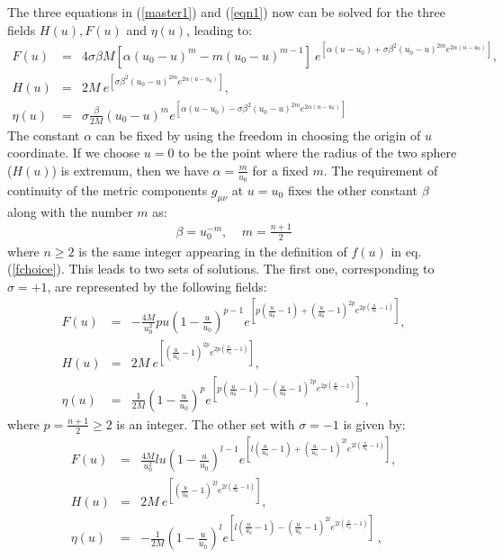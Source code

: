 \documentclass[preprint,aps,superscriptaddress,nofootinbib]{revtex4-1}
\begin{document}
The three equations in (\ref{master1}) and (\ref{eqn1}) now can be 
solved for the three fields $H(u),F(u)$ and $\eta(u)$, leading to:
\begin{eqnarray}\label{nonsingular1}
F(u)&=&4\sigma\beta M \left[\alpha(u_0-u)^m-m(u_0-u)^{m-1}\right] 
~e^{\left[\alpha(u-u_0)+\sigma\beta^2 (u_0-u)^{2m} e^{2\alpha
(u-u_0)}\right]},\nonumber\\ 
H(u)&=&2M ~e^{\left[\sigma\beta^2 (u_0-u)^{2m} 
e^{2\alpha(u-u_0)}\right]},\nonumber\\ 
\eta(u)&=&\sigma \frac{\beta}{2 M} (u_0-u)^m e^{\left[\alpha
(u-u_0)-\sigma\beta^2 (u_0-u)^{2m} e^{2\alpha(u-u_0)}\right]}
\end{eqnarray}
The constant $\alpha$ can be fixed by using the freedom in choosing 
the origin of $u$ coordinate. If we choose $u=0$ to be the point where 
the radius of the two sphere ($H(u)$) is extremum, then we have 
$\alpha=\frac{m}{u_0}$ for a fixed $m$.
The requirement of continuity of the metric components $g_{\mu\nu}$ 
at $u=u_0$ fixes the other constant $\beta$ along with the number $m$ 
as:
\begin{eqnarray*}
\beta=u_0^{-m},~~~~~m=\frac{n+1}{2}
\end{eqnarray*}
where $n\geq 2$ is the same integer appearing in the definition of $f(u)$ 
in eq.(\ref{fchoice}). This leads to two sets of solutions. The first 
one, corresponding to $\sigma=+1$, are represented by the following 
fields:
\begin{eqnarray}\label{nonsingular2}
F(u)&=&-\frac{4 M}{u_0^2} p u \left(1-\frac{u}{u_0}\right)^{p-1} 
e^{\left[p\left(\frac{u}{u_0}-1\right)+ \left(\frac{u}{u_0}-1\right)^{2p} 
e^{2p\left(\frac{u}{u_0}-1\right)}\right]},\nonumber\\
% 
H(u)&=&2M ~e^{\left[ \left(\frac{u}{u_0}-1\right)^{2p} 
e^{2p\left(\frac{u}{u_0}-1\right)}\right]},\nonumber\\ 
%
\eta(u)&=& \frac{1}{2 M} \left(1-\frac{u}{u_0}\right)^p 
e^{\left[p\left(\frac{u}{u_0}-1\right)- 
\left(\frac{u}{u_0}-1\right)^{2p} e^{2p\left(\frac{u}{u_0}
-1\right)}\right]}~,
\end{eqnarray}
where $p=\frac{n+1}{2}\geq 2$ is an integer. The other set with 
$\sigma=-1$ is given by:
\begin{eqnarray}\label{nonsingular1}
F(u)&=&\frac{4  M}{u_0^2} l u \left(1-\frac{u}{u_0}\right)^{l-1} 
e^{\left[l\left(\frac{u}{u_0}-1\right)+ 
\left(\frac{u}{u_0}-1\right)^{2l} e^{2l\left(\frac{u}
{u_0}-1\right)}\right]},\nonumber\\
% 
H(u)&=&2M ~e^{\left[ \left(\frac{u}{u_0}-1\right)^{2l} e^{2l
\left(\frac{u}{u_0}-1\right)}\right]},\nonumber\\ 
%
\eta(u)&=& -\frac{1}{2 M} \left(1-\frac{u}{u_0}\right)^l 
e^{\left[l\left(\frac{u}{u_0}-1\right)- 
\left(\frac{u}{u_0}-1\right)^{2l} e^{2l\left(\frac{u}
{u_0}-1\right)}\right]}~,
\end{eqnarray}
\end{document}
